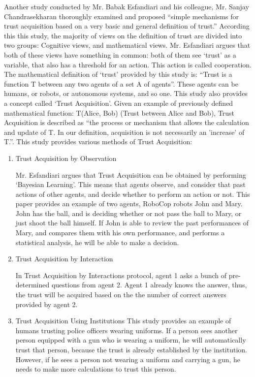 \documentclass[runningheads,a4paper]{llncs}
\begin{document}
Another study conducted by Mr. Babak Esfandiari and his colleague, Mr. Sanjay Chandrasekharan \cite{esfandiari2001agents} thoroughly examined and proposed ``simple
mechanisms for trust acquisition based on a very basic and general definition of trust.'' According this this study, the majority of views on the definition of trust are divided into two groups: Cognitive views, and mathematical views. Mr. Esfandiari argues that both of these views have something in common: both of them see `trust' as a variable, that also has a threshold for an action. This action is called cooperation. The mathematical definition of `trust' provided by this study is: ``Trust is a function T between any two agents of a set A of agents''. These agents can be humans, or robots, or autonomous systems, and so one. This study also provides a concept called `Trust Acquisition'. Given an example of previously defined mathematical function: T(Alice, Bob) (Trust between Alice and Bob), Trust Acquisition is described as ``the process or mechanism that allows the calculation and update of T. In our
definition, acquisition is not necessarily an 'increase' of T.''. This study provides various methods of Trust Acquisition:
\begin{enumerate}
	\item Trust Acquisition by Observation
	
	Mr. Esfandiari argues that Trust Acquisition can be obtained by performing `Bayesian Learning'. This means that agents observe, and consider that past actions of other agents, and decide whether to perform an action or not. This paper provides an example of two agents, RoboCop robots John and Mary. John has the ball, and is deciding whether or not pass the ball to Mary, or just shoot the ball himself. If John is able to review the past performances of Mary, and compares them with his own performance, and performs a statistical analysis, he will be able to make a decision.
	\item Trust Acquisition by Interaction

	
	In Trust Acquisition by Interactions protocol, agent 1 asks a bunch of pre-determined questions from agent 2. Agent 1 already knows the answer, thus, the trust will be acquired based on the the number of correct answers provided by agent 2.
	\item Trust Acquisition Using Institutions
	This study provides an example of humans trusting police officers wearing uniforms. If a person sees another person equipped with a gun who is wearing a uniform, he will automatically trust that person, because the trust is already established by the institution. However, if he sees a person not wearing a uniform and carrying a gun, he needs to make more calculations to trust this person.
	
\end{enumerate}
\end{document}
